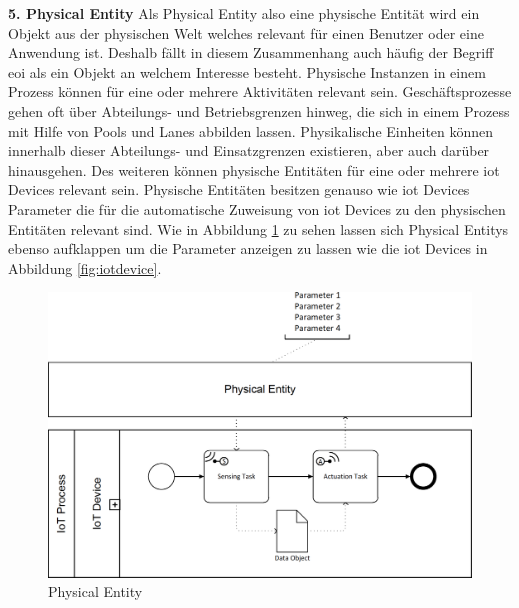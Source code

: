 \documentclass[a4paper, 12pt, twoside, headsepline=true]{scrartcl} %
\begin{document}
\textbf{5. Physical Entity}
\newline
Als Physical Entity also eine physische Entität wird ein Objekt aus der physischen Welt welches relevant für einen Benutzer oder eine Anwendung ist. Deshalb fällt in diesem Zusammenhang auch häufig der Begriff \acl{eoi} als ein Objekt an welchem Interesse besteht. Physische Instanzen in einem Prozess können für eine oder mehrere Aktivitäten relevant sein. Geschäftsprozesse gehen oft über Abteilungs- und Betriebsgrenzen hinweg, die sich in einem Prozess mit Hilfe von Pools und Lanes abbilden lassen. Physikalische Einheiten können innerhalb dieser Abteilungs- und Einsatzgrenzen existieren, aber auch darüber hinausgehen. Des weiteren können physische Entitäten für eine oder mehrere \ac{iot} Devices relevant sein\cite[S.58-59]{conceptsiotawarepm}. Physische Entitäten besitzen genauso wie \ac{iot} Devices Parameter die für die automatische Zuweisung von \ac{iot} Devices zu den physischen Entitäten relevant sind. Wie in Abbildung \ref{fig:physicalentity} zu sehen lassen sich Physical Entitys ebenso aufklappen um die Parameter anzeigen zu lassen wie die \ac{iot} Devices in Abbildung \ref{fig:iotdevice}. 

\begin{figure}[H]
	\includegraphics[height=7.3 cm,keepaspectratio,center]{figures/PhysicalEntity}
	\caption{Physical Entity \cite[S.62]{conceptsiotawarepm}}
	\label{fig:physicalentity}
\end{figure} 
\end{document}
